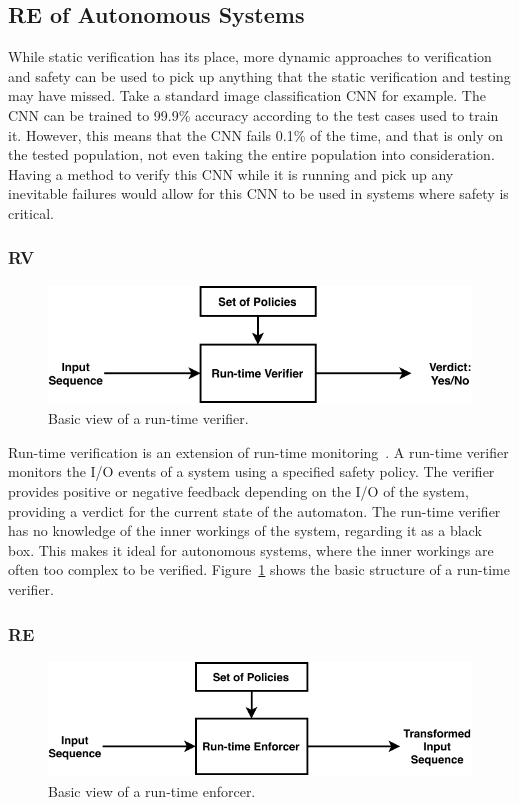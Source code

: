 \subsection{\acf{RE} of Autonomous Systems}
While static verification has its place, more dynamic approaches to verification and safety can be used to pick up anything that the static verification and testing may have missed.
Take a standard image classification \ac{CNN} for example.
The \ac{CNN} can be trained to 99.9\% accuracy according to the test cases used to train it.
However, this means that the \ac{CNN} fails 0.1\% of the time, and that is only on the tested population, not even taking the entire population into consideration.
Having a method to verify this \ac{CNN} while it is running and pick up any inevitable failures would allow for this \ac{CNN} to be used in systems where safety is critical.

\subsubsection{\acf{RV}}
\begin{figure}[h]
	\centering
	\includegraphics[width=\textwidth]{Content/fig/RV-basic.pdf}
	\caption{Basic view of a run-time verifier. \label{fig:rvbasic}}
\end{figure}

Run-time verification is an extension of run-time monitoring~\cite{runtime-verify}.
A run-time verifier monitors the I/O events of a system using a specified safety policy.
The verifier provides positive or negative feedback depending on the I/O of the system, providing a verdict for the current state of the automaton.
The run-time verifier has no knowledge of the inner workings of the system, regarding it as a black box.
This makes it ideal for autonomous systems, where the inner workings are often too complex to be verified.
Figure~\ref{fig:rvbasic} shows the basic structure of a run-time verifier.

\subsubsection{\acf{RE}}
\begin{figure}[h]
	\centering
	\includegraphics[width=\textwidth]{Content/fig/RE-basic.pdf}
	\caption{Basic view of a run-time enforcer. \label{fig:rebasic}}
\end{figure}

